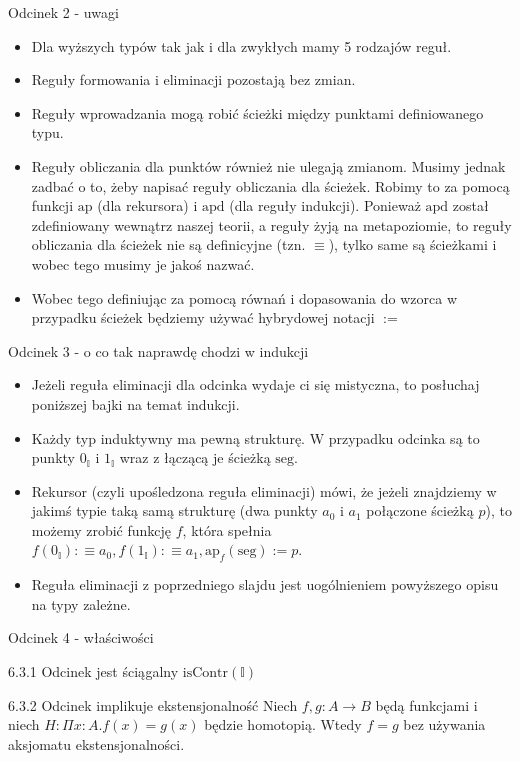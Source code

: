 \documentclass{beamer}
\newcommand{\defn}{:\equiv}
\newcommand{\ap}[2]{\text{ap}_{#1}(#2)}
\newcommand{\isContr}{\text{isContr}}
\newcommand{\I}{\mathbb{I}}
\newcommand{\IZ}{0_\mathbb{I}}
\newcommand{\II}{1_\mathbb{I}}
\newcommand{\seg}{\text{seg}}
\begin{document}
\begin{frame}{Odcinek 2 - uwagi}
\begin{itemize}
	\item Dla wyższych typów tak jak i dla zwykłych mamy 5 rodzajów reguł.
	\item Reguły formowania i eliminacji pozostają bez zmian.
	\item Reguły wprowadzania mogą robić ścieżki między punktami definiowanego typu.
	\item Reguły obliczania dla punktów również nie ulegają zmianom. Musimy jednak zadbać o to, żeby napisać reguły obliczania dla ścieżek. Robimy to za pomocą funkcji $\text{ap}$ (dla rekursora) i $\text{apd}$ (dla reguły indukcji). Ponieważ $\text{apd}$ został zdefiniowany wewnątrz naszej teorii, a reguły żyją na metapoziomie, to reguły obliczania dla ścieżek nie są definicyjne (tzn. $\equiv$), tylko same są ścieżkami i wobec tego musimy je jakoś nazwać.
	\item Wobec tego definiując za pomocą równań i dopasowania do wzorca w przypadku ścieżek będziemy używać hybrydowej notacji $:=$
\end{itemize}
\end{frame}

\begin{frame}{Odcinek 3 - o co tak naprawdę chodzi w indukcji}
\begin{itemize}
	\item Jeżeli reguła eliminacji dla odcinka wydaje ci się mistyczna, to posłuchaj poniższej bajki na temat indukcji.
	\item Każdy typ induktywny ma pewną strukturę. W przypadku odcinka są to punkty $\IZ$ i $\II$ wraz z łączącą je ścieżką $\seg$.
	\item Rekursor (czyli upośledzona reguła eliminacji) mówi, że jeżeli znajdziemy w jakimś typie taką samą strukturę (dwa punkty $a_0$ i $a_1$ połączone ścieżką $p$), to możemy zrobić funkcję $f$, która spełnia $f(\IZ) \defn a_0, f(\II) \defn a_1, \ap{f}{\seg} := p$.
	\item Reguła eliminacji z poprzedniego slajdu jest uogólnieniem powyższego opisu na typy zależne.
\end{itemize}
\end{frame}

\begin{frame}{Odcinek 4 - właściwości}
	
\begin{block}{6.3.1 Odcinek jest ściągalny}
$\isContr(\I)$
\end{block}

\begin{block}{6.3.2 Odcinek implikuje ekstensjonalność}
Niech $f, g : A \to B$ będą funkcjami i niech $H : \Pi x : A. f(x) = g(x)$ będzie homotopią. Wtedy $f = g$ bez używania aksjomatu ekstensjonalności.
\end{block}

\end{frame}
\end{document}
